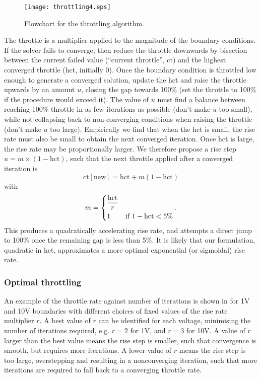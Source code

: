 \begin{figure}
\centering
\texttt{[image: throttling4.eps]}
\caption{Flowchart for the throttling algorithm. }
\label{fig:throttling_algorithm}
\end{figure}

The throttle is a multiplier
applied to the magnitude of the boundary conditions.
If the solver fails to converge, then reduce the throttle downwards by
bisection between the current failed value (``current throttle'', ct) and the highest converged
throttle (hct, initially 0). Once the boundary
condition is throttled low enough to generate a converged solution,
update the hct and raise
the throttle upwards by an amount $u$, closing the gap towards 100\% (set the throttle
to 100\% if the procedure would exceed it).  The value of $u$
must find a balance between reaching 100\% throttle in as few
iterations as possible (don't make $u$ too small), while not collapsing back to non-converging
conditions when raising the throttle (don't make $u$ too
large). Empirically we find that when the hct is small, the rise rate
must also be small to obtain the next converged iteration. Once hct is
large, the rise rate may be proportionally larger. We therefore
propose a rise step $u=m\times (1- \mathrm{hct})$, such that the next
throttle applied after a converged iteration is
\begin{equation}
  \mathrm{ct [new]} = \mathrm{hct} + m (1-\mathrm{hct})
\end{equation}
with
\begin{equation}
  m=
  \begin{dcases}
    \frac{\mathrm{hct}}{r} & \\
    1 & \text{if } 1-\mathrm{hct} < 5\%
  \end{dcases}.
\end{equation}
This produces a quadratically accelerating rise rate,  and attempts a
direct jump to 100\% once the remaining gap is less than 5\%.  It is likely
that our formulation, quadratic in hct, approximates a more 
optimal exponential (or
sigmoidal) rise rate.

\subsubsection{Optimal throttling}
An example of
the  throttle rate against number of iterations is shown in
 for 1V and 10V boundaries with different
choices of fixed values of the rise rate multiplier $r$. A best value of $r$ can be identified
for each voltage, minimising the number of iterations required,
e.g. $r=2$ for 1V, and $r=3$ for 10V. A
value of $r$ larger than the best value means the rise step is
smaller, such that convergence is smooth, but requires more
iterations. A lower value of $r$ means the rise step is too large,
overstepping and resulting in a nonconverging iteration, such that
more iterations are required to fall back to a converging throttle rate.

